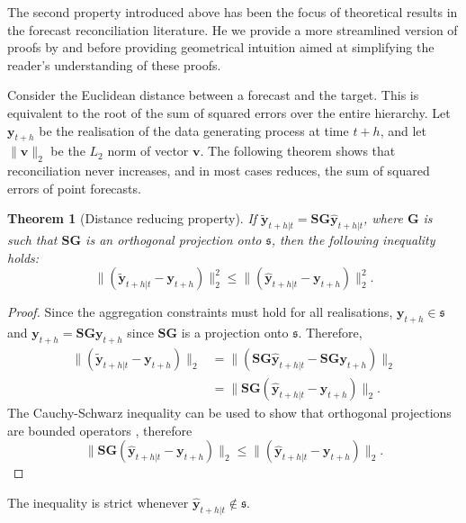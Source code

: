 \documentclass[12pt]{article}
\newtheorem{theo}{Theorem}[section]
\theoremstyle{definition}
\theoremstyle{property}
\begin{document}
	The second property introduced above has been the focus of theoretical results in the forecast reconciliation literature.  He we provide a more streamlined version of proofs by \cite{VanErven2015a} and \cite{Wickramasuriya2017} before providing geometrical intuition aimed at simplifying the reader's understanding of these proofs.
	
	Consider the Euclidean distance between a forecast and the target. This is equivalent to the root of the sum of squared errors over the entire hierarchy. Let $\bm{y}_{t+h}$ be the realisation of the data generating process at time $t+h$, and let $\|\bm{v}\|_2$ be the $L_2$ norm of vector $\bm{v}$. The following theorem shows that reconciliation never increases, and in most cases reduces, the sum of squared errors of point forecasts.
	
	
	\begin{theo}[Distance reducing property]\label{th:distred}
		If $\tilde{\bm{y}}_{t+h|t}=\bm{S}\bm{G}\hat{\bm{y}}_{t+h|t}$, where $\bm{G}$ is such that $\bm{S}\bm{G}$ is an orthogonal projection onto $\mathfrak{s}$, then the following inequality holds:
		\begin{equation}
		\|(\tilde{\bm{y}}_{t+h|t}-\bm{y}_{t+h})\|^2_2\le\|(\hat{\bm{y}}_{t+h|t}-\bm{y}_{t+h})\|^2_2.
		\end{equation}
	\end{theo}
	\begin{proof}
		Since the aggregation constraints must hold for all realisations, $\bm{y}_{t+h}\in\mathfrak{s}$ and $\bm{y}_{t+h}=\bm{S}\bm{G}\bm{y}_{t+h}$ since $\bm{S}\bm{G}$ is a projection onto $\mathfrak{s}$. Therefore,
		\begin{align}
		\|(\tilde{\bm{y}}_{t+h|t}-\bm{y}_{t+h})\|_2&=\|(\bm{S}\bm{G}\hat{\bm{y}}_{t+h|t}-\bm{S}\bm{G}\bm{y}_{t+h})\|_2\\
		&=\|\bm{S}\bm{G}(\hat{\bm{y}}_{t+h|t}-\bm{y}_{t+h})\|_2.
		\end{align}
		The Cauchy-Schwarz inequality can be used to show that orthogonal projections are bounded operators \citep{Hun2001}, therefore
		\begin{equation*}
		\|\bm{S}\bm{G}(\hat{\bm{y}}_{t+h|t}-\bm{y}_{t+h})\|_2\le
		\|(\hat{\bm{y}}_{t+h|t}-\bm{y}_{t+h})\|_2.
		\end{equation*}
	\end{proof}
	The inequality is strict whenever $\hat{\bm{y}}_{t+h|t}\notin\mathfrak{s}$.
	
	
\end{document}
